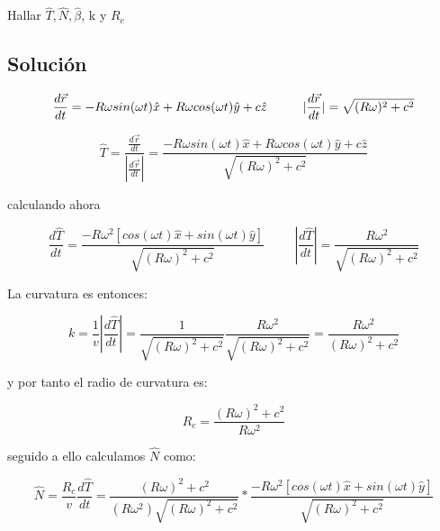 \documentclass[12 pt]{article}
\begin{document}
Hallar $\hat{T},\hat{N}, \hat{\beta}$, k y $R_{c}$

\subsection*{Solución}
\begin{equation*}
\frac{d\vec{r}}{dt} = -R \omega sin(\omega t) \hat{x} + R \omega cos(\omega t)\hat{y} + c \hat{z} \hspace{1 cm}|\frac{d\vec{r}}{dt} |= \sqrt{(R\omega)^{2} +c^{2}}
\end{equation*}

\begin{equation*}
\hat{T} = \dfrac{\frac{d\vec{r}}{dt}}{|\frac{d\vec{r}}{dt}|} = \dfrac{-R \omega sin(\omega t) \hat{x} + R \omega cos(\omega t)\hat{y} + c \hat{z} }{\sqrt{(R\omega)^{2} +c^{2}}}
\end{equation*}


 calculando ahora 
 
\begin{equation*}
\frac{d\hat{T}}{dt} = \frac{-R \omega^{2} [cos(\omega t) \hat{x}+ sin(\omega t) \hat{y}]}{\sqrt{(R\omega)^{2} +c^{2}}} \hspace{1cm} |\frac{d\hat{T}}{dt}| = \frac{R \omega^{2}}{\sqrt{(R\omega)^{2} +c^{2}}}
\end{equation*}



La curvatura es entonces: 

\begin{equation*}
 k = \frac{1}{v}|\frac{d\hat{T}}{dt}| = \frac{1}{\sqrt{(R\omega)^{2} +c^{2}}} \frac{R \omega^{2}}{\sqrt{(R\omega)^{2} +c^{2}}}  =  \frac{R \omega^{2}}{(R\omega)^{2} +c^{2}}
\end{equation*}


y por tanto el radio de curvatura es:

\begin{equation*}
R_{c}= \frac{(R\omega)^{2} +c^{2}}{R \omega^{2}}
\end{equation*}

seguido a ello calculamos $\hat{N}$ como:

\begin{equation*}
\hat{N}= \frac{R_{c}}{v} \frac{d\hat{T}}{dt} = \dfrac{(R\omega)^{2} +c^{2}}{ (R\omega^{2})\sqrt{(R\omega)^{2} +c^{2}}}*\frac{-R \omega^{2} [cos(\omega t) \hat{x}+ sin(\omega t) \hat{y}]}{\sqrt{(R\omega)^{2} +c^{2}}} 
\end{equation*}
\end{document}
